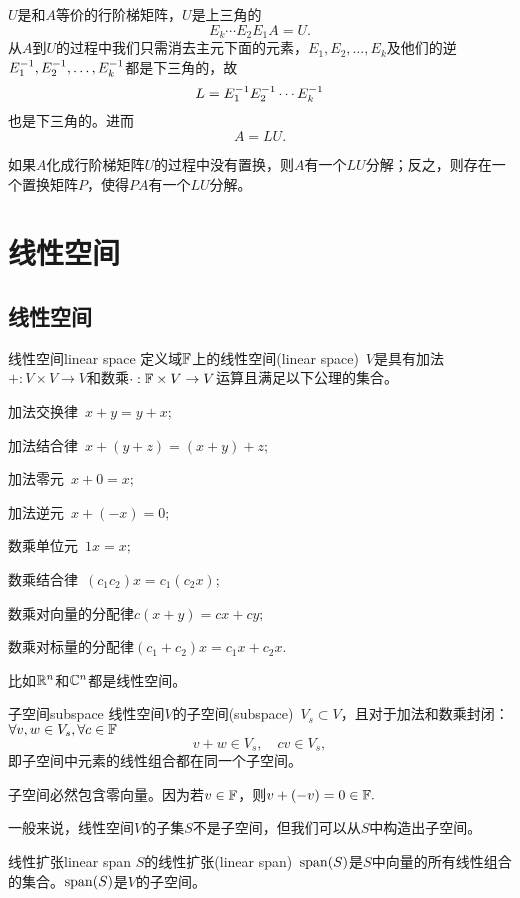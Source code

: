 $U$是和$A$等价的行阶梯矩阵，$U$是上三角的
\[
	E_k\cdots E_2E_1A=U.
\]
从$A$到$U$的过程中我们只需消去主元下面的元素，$E_1,E_2,\ldots,E_k$及他们的逆$E_1^{-1},E_2^{-1},\ldots,E_k^{-1}$都是下三角的，故
\[
	L=E_1^{-1} E_2^{-1}\cdots E_k^{-1}
\]
也是下三角的。进而
\begin{equation}
	A=LU.
\end{equation}

如果$A$化成行阶梯矩阵$U$的过程中没有置换，则$A$有一个$LU$分解；反之，则存在一个置换矩阵$P$，使得$PA$有一个$LU$分解。

\clearpage
\section{线性空间}
\subsection{线性空间}
\begin{definition}{线性空间}{linear space}
	定义域$\mathbb F$上的线性空间(linear space)~$V$是具有加法$+:V\times V\to V$和数乘$\cdot:\mathbb F\times V\to V$运算且满足以下公理的集合。
	\begin{compactenum}
		\item 加法交换律\qquad\qquad~$x+y=y+x;$
		\item 加法结合律\qquad\qquad~$x+(y+z)=(x+y)+z;$
		\item 加法零元\qquad\qquad\quad~$x+0=x;$
		\item 加法逆元\qquad\qquad\quad~$x+(-x)=0;$
		\item 数乘单位元\qquad\qquad~$1x=x;$
		\item 数乘结合律\qquad\qquad~$(c_1c_2)x=c_1(c_2x);$
		\item 数乘对向量的分配律$c(x+y)=cx+cy;$
		\item 数乘对标量的分配律$(c_1+c_2)x=c_1x+c_2x.$
	\end{compactenum}
\end{definition}
比如$\mathbb R^n$和$\mathbb C^n$都是线性空间。
\begin{definition}{子空间}{subspace}
	线性空间$V$的子空间(subspace)~$V_s\subset V$，且对于加法和数乘封闭：$\forall v,w\in V_s,\forall c\in\mathbb F$
	\[
		v+w\in V_s,\quad cv\in V_s,
	\]
	即子空间中元素的线性组合都在同一个子空间。
\end{definition}
子空间必然包含零向量。因为若$v\in\mathbb F$，则$v+(-v)=0\in\mathbb F.$

一般来说，线性空间$V$的子集$S$不是子空间，但我们可以从$S$中构造出子空间。

\begin{definition}{线性扩张}{linear span}
	$S$的线性扩张(linear span)~$\operatorname{span}(S)$是$S$中向量的所有线性组合的集合。$\operatorname{span}(S)$是$V$的子空间。
\end{definition}
